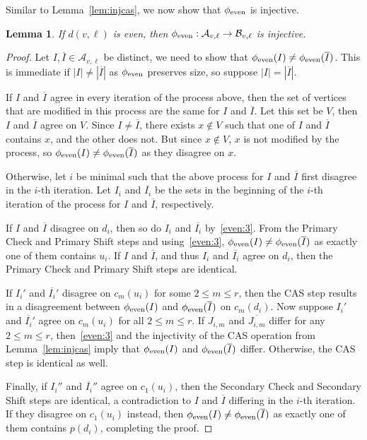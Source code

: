 \documentclass[11pt]{article}
\newtheorem{lemma}[theorem]{Lemma}
\theoremstyle{definition}
\begin{document}
\medskip

Similar to Lemma~\ref{lem:injcas}, we now show that $\phi_{\textup{even}}$ is injective.
\begin{lemma}\label{lem:injeven}
If $d(v,\ell)$ is even, then $\phi_{\textup{even}}:\mathcal{A}_{v,\ell}\to\mathcal{B}_{v,\ell}$ is injective. 
\end{lemma}
\begin{proof}
Let $I,\overline{I}\in\mathcal{A}_{v,\ell}$ be distinct, we need to show that $\phi_{\textup{even}}(I)\not=\phi_{\textup{even}}(\overline{I})$. This is immediate if $|I|\not=|\overline{I}|$ as $\phi_{\textup{even}}$ preserves size, so suppose $|I|=|\overline{I}|$.

If $I$ and $\overline{I}$ agree in every iteration of the process above, then the set of vertices that are modified in this process are the same for $I$ and $\overline{I}$. Let this set be $V$, then $I$ and $\overline{I}$ agree on $V$. Since $I\not=\overline{I}$, there exists $x\not\in V$ such that one of $I$ and $\overline{I}$ contains $x$, and the other does not. But since $x\not\in V$, $x$ is not modified by the process, so $\phi_{\textup{even}}(I)\not=\phi_{\textup{even}}(\overline{I})$ as they disagree on $x$.

Otherwise, let $i$ be minimal such that the above process for $I$ and $\overline{I}$ first disagree in the $i$-th iteration. Let $I_i$ and $\overline{I_i}$ be the sets in the beginning of the $i$-th iteration of the process for $I$ and $\overline{I}$, respectively. 

If $I$ and $\overline{I}$ disagree on $d_i$, then so do $I_i$ and $\overline{I_i}$ by~\ref{even:3}. From the Primary Check and Primary Shift steps and using~\ref{even:3}, $\phi_{\textup{even}}(I)\not=\phi_{\textup{even}}(\overline{I})$ as exactly one of them contains $u_i$. If $I$ and $\overline{I}$, and thus $I_i$ and $\overline{I_i}$ agree on $d_i$, then the Primary Check and Primary Shift steps are identical.

If $I_i'$ and $\overline{I_i}'$ disagree on $c_m(u_i)$ for some $2\leq m\leq r$, then the CAS step results in a disagreement between $\phi_{\textup{even}}(I)$ and $\phi_{\textup{even}}(\overline{I})$ on $c_m(d_i)$. Now suppose $I_i'$ and $\overline{I_i}'$ agree on $c_m(u_i)$ for all $2\leq m\leq r$. If $J_{i,m}$ and $\overline{J_{i,m}}$ differ for any $2\leq m\leq r$, then~\ref{even:3} and the injectivity of the CAS operation from Lemma~\ref{lem:injcas} imply that $\phi_{\textup{even}}(I)$ and $\phi_{\textup{even}}(\overline{I})$ differ. Otherwise, the CAS step is identical as well. 

Finally, if $I_i''$ and $\overline{I_i}''$ agree on $c_1(u_i)$, then the Secondary Check and Secondary Shift steps are identical, a contradiction to $I$ and $\overline I$ differing in the $i$-th iteration. If they disagree on $c_1(u_i)$ instead, then $\phi_{\textup{even}}(I)\not=\phi_{\textup{even}}(\overline I)$ as exactly one of them contains $p(d_i)$, completing the proof.
\end{proof}
\end{document}
